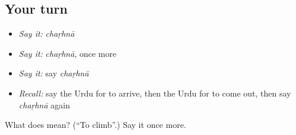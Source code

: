 \subsection*{Your turn}
\begin{itemize}
\raggedright
  \item \emph{Say it:} \emph{chaṛhnā}
  \item \emph{Say it:} \emph{chaṛhnā}, once more
  \item \emph{Say it:} say \emph{chaṛhnā}
  \item \emph{Recall:} say the Urdu for to arrive, then the Urdu for to come out, then say \emph{chaṛhnā} again
\end{itemize}

\begin{tcolorbox}[breakable,colback=teal!4,colframe=teal!35!black,title={Before you move on}]
What does  mean? (\textquotedblleft{}To climb\textquotedblright{}.) Say it once more.
\end{tcolorbox}

